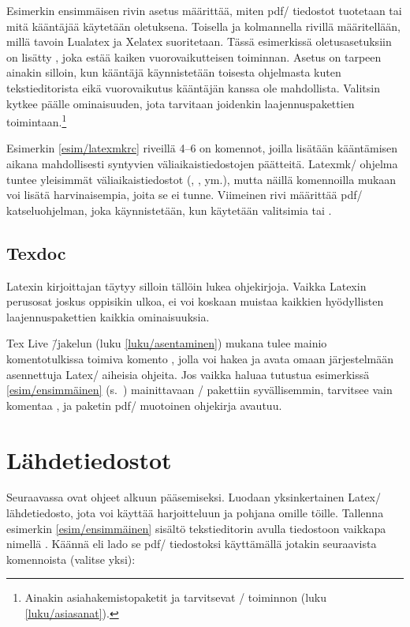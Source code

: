 Esimerkin ensimmäisen rivin asetus määrittää, miten pdf\-/ tiedostot
tuotetaan tai mitä kääntäjää käytetään oletuksena. Toisella ja
kolmannella rivillä määritellään, millä tavoin Lualatex ja Xelatex
suoritetaan. Tässä esimerkissä oletusasetuksiin on lisätty
, joka estää kaiken
vuorovaikutteisen toiminnan. Asetus on tarpeen ainakin silloin, kun
kääntäjä käynnistetään toisesta ohjelmasta kuten tekstieditorista eikä
vuorovaikutus kääntäjän kanssa ole mahdollista. Valitsin
 kytkee päälle ominaisuuden, jota tarvitaan
joidenkin laajennuspakettien toimintaan.\footnote{Ainakin
  asiahakemistopaketit  ja 
  tarvitsevat \-/ toiminnon (luku
  \ref{luku/asiasanat}).}

Esimerkin \ref{esim/latexmkrc} riveillä 4--6 on komennot, joilla
lisätään kääntämisen aikana mahdollisesti syntyvien
väliaikaistiedostojen päätteitä. Latexmk\-/ ohjelma tuntee yleisimmät
väliaikaistiedostot (, ,  ym.), mutta
näillä komennoilla mukaan voi lisätä harvinaisempia, joita se ei tunne.
Viimeinen rivi määrittää pdf\-/ katseluohjelman, joka käynnistetään, kun
käytetään valitsimia  tai .

\subsection{Texdoc}

Latexin kirjoittajan täytyy silloin tällöin lukea ohjekirjoja. Vaikka
Latexin perusosat joskus oppisikin ulkoa, ei voi koskaan muistaa
kaikkien hyödyllisten laajennuspakettien kaikkia ominaisuuksia.

Tex Live \=/jakelun (luku \ref{luku/asentaminen}) mukana tulee mainio
komentotulkissa toimiva komento , jolla voi hakea ja avata
omaan järjestelmään asennettuja Latex\-/ aiheisia ohjeita. Jos vaikka
haluaa tutustua esimerkissä \ref{esim/ensimmäinen}
(s.~\pageref{esim/ensimmäinen}) mainittavaan \-/
pakettiin syvällisemmin, tarvitsee vain komentaa , ja paketin pdf\-/ muotoinen ohjekirja avautuu.

\section{Lähdetiedostot}

Seuraavassa ovat ohjeet alkuun pääsemiseksi. Luodaan yksinkertainen
Latex\-/ lähdetiedosto, jota voi käyttää harjoitteluun ja pohjana omille
töille. Tallenna esimerkin \ref{esim/ensimmäinen} sisältö tekstieditorin
avulla tiedostoon vaikkapa nimellä . Käännä eli
lado se pdf\-/ tiedostoksi käyttämällä jotakin seuraavista komennoista
(valitse yksi):

